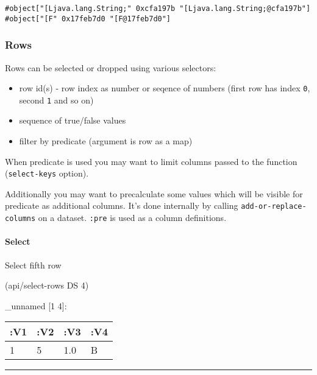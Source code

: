 \documentclass[]{article}
\newenvironment{Shaded}{\begin{snugshade}}{\end{snugshade}}
\newcommand{\DecValTok}[1]{\textcolor[rgb]{0.00,0.00,0.81}{#1}}
\newcommand{\NormalTok}[1]{#1}
\providecommand{\tightlist}{%
  \setlength{\itemsep}{0pt}\setlength{\parskip}{0pt}}
\let\oldparagraph\paragraph
\renewcommand{\paragraph}[1]{\oldparagraph{#1}\mbox{}}
\begin{document}
\begin{verbatim}
#object["[Ljava.lang.String;" 0xcfa197b "[Ljava.lang.String;@cfa197b"]
#object["[F" 0x17feb7d0 "[F@17feb7d0"]
\end{verbatim}

\hypertarget{rows}{%
\subsubsection{Rows}\label{rows}}

Rows can be selected or dropped using various selectors:

\begin{itemize}
\tightlist
\item
  row id(s) - row index as number or seqence of numbers (first row has
  index \texttt{0}, second \texttt{1} and so on)
\item
  sequence of true/false values
\item
  filter by predicate (argument is row as a map)
\end{itemize}

When predicate is used you may want to limit columns passed to the
function (\texttt{select-keys} option).

Additionally you may want to precalculate some values which will be
visible for predicate as additional columns. It's done internally by
calling \texttt{add-or-replace-columns} on a dataset. \texttt{:pre} is
used as a column definitions.

\hypertarget{select-1}{%
\paragraph{Select}\label{select-1}}

Select fifth row

\begin{Shaded}
\begin{Highlighting}[]
\NormalTok{(api/select-rows DS }\DecValTok{4}\NormalTok{)}
\end{Highlighting}
\end{Shaded}

\_unnamed {[}1 4{]}:

\begin{longtable}[]{@{}llll@{}}
\toprule
:V1 & :V2 & :V3 & :V4\tabularnewline
\midrule
\endhead
1 & 5 & 1.0 & B\tabularnewline
\bottomrule
\end{longtable}

\begin{center}\rule{0.5\linewidth}{0.5pt}\end{center}
\end{document}
